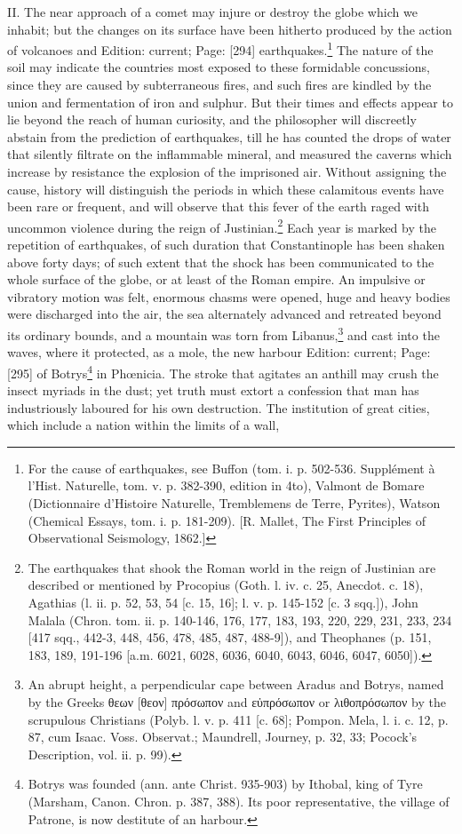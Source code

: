 II. The near approach of a comet may injure or destroy the globe which we inhabit; but the changes on its surface have been hitherto produced by the action of volcanoes and Edition: current; Page: [294] earthquakes.\footnote{For the cause of earthquakes, see Buffon (tom. i. p. 502-536. Supplément à l\texthebrew{}’Hist. Naturelle, tom. v. p. 382-390, edition in 4to), Valmont de Bomare (Dictionnaire d\texthebrew{}’Histoire Naturelle, Tremblemens de Terre, Pyrites), Watson (Chemical Essays, tom. i. p. 181-209). [R. Mallet, The First Principles of Observational Seismology, 1862.]} The nature of the soil may indicate the countries most exposed to these formidable concussions, since they are caused by subterraneous fires, and such fires are kindled by the union and fermentation of iron and sulphur. But their times and effects appear to lie beyond the reach of human curiosity, and the philosopher will discreetly abstain from the prediction of earthquakes, till he has counted the drops of water that silently filtrate on the inflammable mineral, and measured the caverns which increase by resistance the explosion of the imprisoned air. Without assigning the cause, history will distinguish the periods in which these calamitous events have been rare or frequent, and will observe that this fever of the earth raged with uncommon violence during the reign of Justinian.\footnote{The earthquakes that shook the Roman world in the reign of Justinian are described or mentioned by Procopius (Goth. l. iv. c. 25, Anecdot. c. 18), Agathias (l. ii. p. 52, 53, 54 [c. 15, 16]; l. v. p. 145-152 [c. 3 sqq.]), John Malala (Chron. tom. ii. p. 140-146, 176, 177, 183, 193, 220, 229, 231, 233, 234 [417 sqq., 442-3, 448, 456, 478, 485, 487, 488-9]), and Theophanes (p. 151, 183, 189, 191-196 [a.m. 6021, 6028, 6036, 6040, 6043, 6046, 6047, 6050]).} Each year is marked by the repetition of earthquakes, of such duration that Constantinople has been shaken above forty days; of such extent that the shock has been communicated to the whole surface of the globe, or at least of the Roman empire. An impulsive or vibratory motion was felt, enormous chasms were opened, huge and heavy bodies were discharged into the air, the sea alternately advanced and retreated beyond its ordinary bounds, and a mountain was torn from Libanus,\footnote{An abrupt height, a perpendicular cape between Aradus and Botrys, named by the Greeks \textgreek{θεων} [\textgreek{θεον}] \textgreek{πρόσωπον} and \textgreek{ε\texthebrew{ὐ}πρόσωπον} or \textgreek{λιθοπρόσωπον} by the scrupulous Christians (Polyb. l. v. p. 411 [c. 68]; Pompon. Mela, l. i. c. 12, p. 87, cum Isaac. Voss. Observat.; Maundrell, Journey, p. 32, 33; Pocock\texthebrew{}’s Description, vol. ii. p. 99).} and cast into the waves, where it protected, as a mole, the new harbour Edition: current; Page: [295] of Botrys\footnote{Botrys was founded (ann. ante Christ. 935-903) by Ithobal, king of Tyre (Marsham, Canon. Chron. p. 387, 388). Its poor representative, the village of Patrone, is now destitute of an harbour.} in Phœnicia. The stroke that agitates an anthill may crush the insect myriads in the dust; yet truth must extort a confession that man has industriously laboured for his own destruction. The institution of great cities, which include a nation within the limits of a wall, 